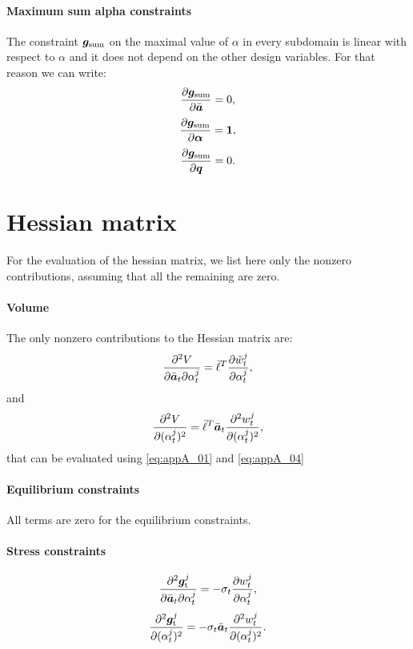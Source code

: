 \paragraph*{Maximum sum alpha constraints}
The constraint $\bm{g}_\text{sum}$ on the maximal value of $\alpha$ in every subdomain is linear with respect to $\alpha$ and it does not depend on the other design variables. For that reason we can write:
\begin{equation}
    \frac{\partial\bm{g}_\text{sum}}{\partial\bar{\bm{a}}}=0,
\end{equation}
\begin{equation}
    \frac{\partial\bm{g}_\text{sum}}{\partial\bm{\alpha}}=\bm{1},
\end{equation}
\begin{equation}
    \frac{\partial\bm{g}_\text{sum}}{\partial\bm{q}}=0.
\end{equation}

\section{Hessian matrix}
For the evaluation of the hessian matrix, we list here only the nonzero contributions, assuming that all the remaining are zero.
\paragraph*{Volume}
The only nonzero contributions to the Hessian matrix are: 
\begin{equation}
    \frac{\partial^2V}{\partial{\bar{\bm{a}}_t}\partial\alpha_t^j} = \bar{\ell}^T \frac{\partial\tilde{w}_t^j}{\partial\alpha_t^j},
\end{equation}
and
\begin{equation}
    \frac{\partial^2V}{\partial(\alpha_t^j)^2} = \bar{\ell}^T \bar{\bm{a}}_t \frac{\partial^2w_t^j}{\partial(\alpha_t^j)^2},
\end{equation}
that can be evaluated using \eqref{eq:appA_01} and \eqref{eq:appA_04}
\paragraph*{Equilibrium constraints}
All terms are zero for the equilibrium constraints.
\paragraph*{Stress constraints}
\begin{equation}
    \frac{\partial^2\bm{g}_\text{t}^j}{\partial{\bar{\bm{a}}_t}\partial\alpha_t^j} = -\sigma_t \frac{\partial w_t^j}{\partial\alpha_t^j},
\end{equation}
\begin{equation}
    \frac{\partial^2\bm{g}_\text{t}^j}{\partial(\alpha_t^j)^2} = -\sigma_t  \bar{\bm{a}}_t \frac{\partial^2w_t^j}{\partial(\alpha_t^j)^2}.
\end{equation}
